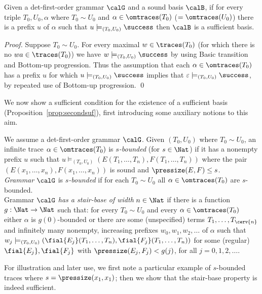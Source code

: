 \documentclass[12pt]{article}
\begin{document}
\begin{prop}\label{prop:infininter}
Given a det-first-order grammar $\calG$ 
and a sound basis $\calB$, 
if for every triple $T_0,U_0,\alpha$ where
$T_0\sim U_0$ and $\alpha\in\omtraces(T_0)$ ($=\omtraces(U_0)$) there is
a prefix $u$ of $\alpha$ such that $u\models_{(T_0,U_0)}\success$ then
$\calB$ is a sufficient basis.
\end{prop}

\begin{proof}
Suppose $T_0\sim U_0$.
For every maximal $w\in\traces(T_0)$ 
(for which there is no $wa\in\traces(T_0)$)
we have $w\models_{(T_0,U_0)}\success$ by using 
Basic transition 
and Bottom-up progression. 
Thus the assumption that each 
$\alpha\in\omtraces(T_0)$ has a prefix $u$ 
for which $u\models_{(T_0,U_0)}\success$ implies that 
$\varepsilon\models_{(T_0,U_0)}\success$, by repeated use of Bottom-up
progression.
\qed
\end{proof}

\noindent
We now show 
a  sufficient condition for the existence
of a sufficient basis (Proposition~\ref{prop:secondsuf}), 
first introducing  some auxiliary notions to this aim.



\begin{defn}
We assume a det-first-order grammar $\calG$. 
Given $(T_0, U_0)$ where  
$T_0\sim U_0$, an infinite trace  $\alpha\in\omtraces(T_0)$ 
is \emph{$s$-bounded} (for $s\in\Nat$)
if it has a nonempty
prefix $u$ such that
$u\models_{(T_0,U_0)}(E(T_1,\dots,T_n), F(T_1,\dots,T_n))$ 
where 
the pair $(E(x_1,\dots,x_n), F(x_1,\dots,x_n))$ is sound and 
$\pressize(E,F)\leq s$.  
\\
\emph{Grammar} $\calG$ is \emph{$s$-bounded} 
if for each
$T_0\sim U_0$ all  $\alpha\in\omtraces(T_0)$ are $s$-bounded.
\\
Grammar $\calG$ \emph{has a stair-base of width}
$n\in\Nat$ 
if 
there is a function $g:\Nat\rightarrow\Nat$ such that: 
for every $T_0\sim U_0$ 
and every $\alpha\in\omtraces(T_0)$
either $\alpha$ is $g(0)$-bounded or there are 
some (unspecified) terms $T_1, \dots, T_{\cerv{n}}$
and infinitely
many nonempty, increasing prefixes $w_0, w_1, w_2,\dots $ of $\alpha$ such
that $w_j\models_{(T_0,U_0)} (\fial{E_j}(T_1,  \dots, T_n), \fial{F_j}(T_1,  \dots, T_n))$
for some (regular) $\fial{E_j},\fial{F_j}$ with
$\pressize(E_j,F_j)<g(j)$, for all $j=0,1,2,\dots$.
\end{defn}
For illustration and later use, we
first note a particular example of $s$-bounded traces where
$s=\pressize(x_1,x_1)$; then we show
that the stair-base property is indeed sufficient.
\end{document}
